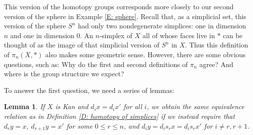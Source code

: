 \documentclass[12pt]{article}
\theoremstyle{plain}
\newtheorem{lemma}[theorem]{Lemma}
\theoremstyle{definition}
\begin{document}
This version of the homotopy groups corresponds more closely to our second version of the sphere in Example \ref{E: sphere}. Recall that, as a simplicial set, this version of the sphere $S^n$ had only two nondegenerate simplices: one in dimension $n$ and one in dimension $0$. An $n$-simplex of $X$ all of whose faces live in $*$ can be thought of as the image of that simplicial version of $S^n$ in $X$. Thus this definition of $\pi_n(X,*)$ also makes some geometric sense. However, there are some obvious questions, such as:  Why do the first and second definitions of $\pi_n$ agree? And where is the group structure we expect?

To answer the first question, we need a series of lemmas:


\begin{lemma}\label{L: alt homotopy}
If $X$ is Kan and $d_ix=d_ix'$ for all $i$, we obtain the same equivalence relation as in Definition \ref{D: homotopy of simplices} if we instead require that $d_ry=x$, $d_{r+1}y=x'$ for some $0\leq r\leq n$,  and $d_iy=d_is_rx=d_is_rx'$ for  $i\neq r, r+1$.
\end{lemma}

\end{document}
